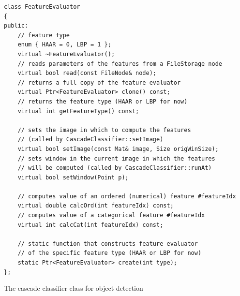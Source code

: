 \begin{lstlisting}
class FeatureEvaluator
{
public:    
    // feature type
    enum { HAAR = 0, LBP = 1 };
    virtual ~FeatureEvaluator();
    // reads parameters of the features from a FileStorage node
    virtual bool read(const FileNode& node);
    // returns a full copy of the feature evaluator
    virtual Ptr<FeatureEvaluator> clone() const;
    // returns the feature type (HAAR or LBP for now)
    virtual int getFeatureType() const;
    
    // sets the image in which to compute the features
    // (called by CascadeClassifier::setImage) 
    virtual bool setImage(const Mat& image, Size origWinSize);
    // sets window in the current image in which the features
    // will be computed (called by CascadeClassifier::runAt)
    virtual bool setWindow(Point p);

    // computes value of an ordered (numerical) feature #featureIdx
    virtual double calcOrd(int featureIdx) const;
    // computes value of a categorical feature #featureIdx
    virtual int calcCat(int featureIdx) const;

    // static function that constructs feature evaluator
    // of the specific feature type (HAAR or LBP for now)
    static Ptr<FeatureEvaluator> create(int type);
};
\end{lstlisting}

The cascade classifier class for object detection

